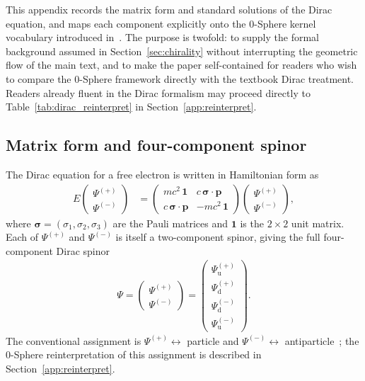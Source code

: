 \documentclass[%
 reprint, amsmath,amssymb, aps, prb, ]{revtex4-2}
\numberwithin{equation}{section}
\begin{document}
This appendix records the matrix form and standard solutions of the Dirac equation, and maps each component explicitly onto the 0-Sphere kernel vocabulary introduced in~\cite{hanamura07}. The purpose is twofold: to supply the formal background assumed in Section~\ref{sec:chirality} without interrupting the geometric flow of the main text, and to make the paper self-contained for readers who wish to compare the 0-Sphere framework directly with the textbook Dirac treatment. Readers already fluent in the Dirac formalism may proceed directly to Table~\ref{tab:dirac_reinterpret} in Section~\ref{app:reinterpret}.

\subsection{Matrix form and four-component spinor}
\label{app:dirac_matrix}

The Dirac equation for a free electron is written in Hamiltonian form as~\cite{Griffiths,J.J.Sakurai}
\begin{align}
E
\begin{pmatrix}
\Psi^{(+)} \\ \Psi^{(-)}
\end{pmatrix}
&=
\begin{pmatrix}
mc^2\,\mathbf{1} & c\,\boldsymbol{\sigma}\cdot\mathbf{p} \\
c\,\boldsymbol{\sigma}\cdot\mathbf{p} & -mc^2\,\mathbf{1}
\end{pmatrix}
\begin{pmatrix}
\Psi^{(+)} \\ \Psi^{(-)}
\end{pmatrix},
\label{eq:dirac_matrix}
\end{align}
where $\boldsymbol{\sigma}=(\sigma_1,\sigma_2,\sigma_3)$ are the Pauli matrices and $\mathbf{1}$ is the $2\times2$ unit matrix. Each of $\Psi^{(+)}$ and $\Psi^{(-)}$ is itself a two-component spinor, giving the full four-component Dirac spinor
\begin{align}
\Psi =
\begin{pmatrix}
\Psi^{(+)} \\ \Psi^{(-)}
\end{pmatrix}
=
\begin{pmatrix}
\Psi^{(+)}_{\mathrm{u}} \\[2pt]
\Psi^{(+)}_{\mathrm{d}} \\[2pt]
\Psi^{(-)}_{\mathrm{d}} \\[2pt]
\Psi^{(-)}_{\mathrm{u}}
\end{pmatrix}.
\label{eq:four_spinor}
\end{align}
The conventional assignment is $\Psi^{(+)}\leftrightarrow$ particle and $\Psi^{(-)}\leftrightarrow$ antiparticle~\cite{Dirac1928}; the 0-Sphere reinterpretation of this assignment is described in Section~\ref{app:reinterpret}.
\end{document}
